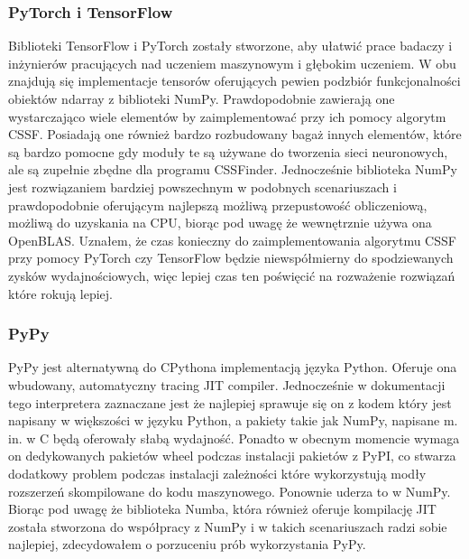 \documentclass[11pt, a4paper]{article}
\begin{document}
\begin{sloppypar}
    \subsubsection{PyTorch i TensorFlow}
    Biblioteki TensorFlow i PyTorch zostały stworzone, aby ułatwić prace badaczy i
    inżynierów pracujących nad uczeniem maszynowym i głębokim uczeniem. W obu znajdują się
    implementacje tensorów oferujących pewien podzbiór funkcjonalności obiektów ndarray z
    biblioteki NumPy. Prawdopodobnie zawierają one wystarczająco wiele elementów by
    zaimplementować przy ich pomocy algorytm CSSF. Posiadają one również bardzo rozbudowany
    bagaż innych elementów, które są bardzo pomocne gdy moduły te są używane do
    tworzenia sieci neuronowych, ale są zupełnie zbędne dla programu CSSFinder.
    Jednocześnie biblioteka NumPy jest rozwiązaniem bardziej powszechnym w podobnych
    scenariuszach i prawdopodobnie oferującym najlepszą możliwą przepustowość
    obliczeniową, możliwą do uzyskania na CPU, biorąc pod uwagę że wewnętrznie używa ona
    OpenBLAS. Uznałem, że czas konieczny do zaimplementowania algorytmu CSSF przy pomocy
    PyTorch czy TensorFlow będzie niewspółmierny do spodziewanych zysków wydajnościowych,
    więc lepiej czas ten poświęcić na rozważenie rozwiązań które rokują lepiej.

    \subsubsection{PyPy}
    PyPy jest alternatywną do CPythona implementacją języka Python. Oferuje ona
    wbudowany, automatyczny tracing JIT compiler. Jednocześnie w dokumentacji tego
    interpretera zaznaczane jest że najlepiej sprawuje się on z kodem który jest
    napisany w większości w języku Python, a pakiety takie jak NumPy, napisane m. in. w
    C będą oferowały słabą wydajność\cite{PyPyPerformance}. Ponadto w obecnym momencie
    wymaga on dedykowanych pakietów wheel podczas instalacji pakietów z PyPI, co stwarza
    dodatkowy problem podczas instalacji zależności które wykorzystują modły rozszerzeń skompilowane
    do kodu maszynowego. Ponownie uderza to w NumPy. Biorąc pod uwagę że biblioteka Numba,
    która również oferuje kompilację JIT została stworzona do współpracy z NumPy i w
    takich scenariuszach radzi sobie najlepiej, zdecydowałem o porzuceniu prób wykorzystania
    PyPy.


\end{sloppypar}
\end{document}
